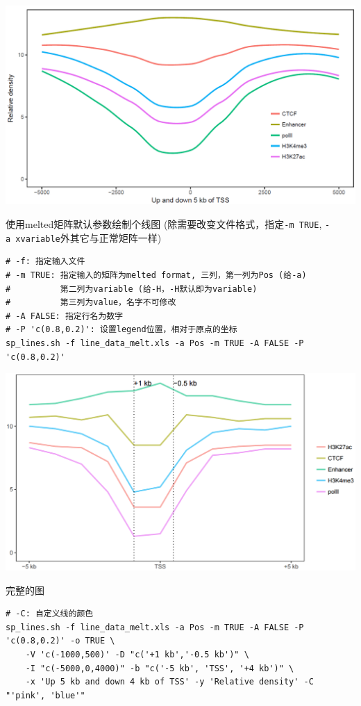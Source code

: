 \documentclass[]{article}
\numberwithin{figure}{section}
\numberwithin{table}{section}
\theoremstyle{definition}
\theoremstyle{definition}
\theoremstyle{definition}
\theoremstyle{remark}
\begin{document}
\begin{center}\includegraphics[width=0.95\linewidth,height=0.7\textheight,keepaspectratio]{images/line_11} \end{center}

使用melted矩阵默认参数绘制个线图
(除需要改变文件格式，指定\texttt{-m\ TRUE},
\texttt{-a\ xvariable}外其它与正常矩阵一样)

\begin{verbatim}
# -f: 指定输入文件
# -m TRUE: 指定输入的矩阵为melted format, 三列，第一列为Pos (给-a)
#          第二列为variable (给-H，-H默认即为variable)
#          第三列为value，名字不可修改
# -A FALSE: 指定行名为数字
# -P 'c(0.8,0.2)': 设置legend位置，相对于原点的坐标
sp_lines.sh -f line_data_melt.xls -a Pos -m TRUE -A FALSE -P 'c(0.8,0.2)'
\end{verbatim}

\begin{center}\includegraphics[width=0.95\linewidth,height=0.7\textheight,keepaspectratio]{images/line_12} \end{center}

完整的图

\begin{verbatim}
# -C: 自定义线的颜色
sp_lines.sh -f line_data_melt.xls -a Pos -m TRUE -A FALSE -P 'c(0.8,0.2)' -o TRUE \
    -V 'c(-1000,500)' -D "c('+1 kb','-0.5 kb')" \
    -I "c(-5000,0,4000)" -b "c('-5 kb', 'TSS', '+4 kb')" \
    -x 'Up 5 kb and down 4 kb of TSS' -y 'Relative density' -C "'pink', 'blue'"
\end{verbatim}
\end{document}
